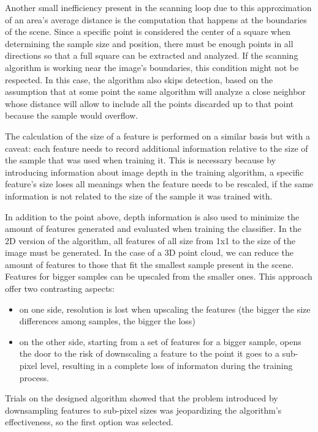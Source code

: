 \documentclass[a4paper,11pt,titlepage]{article}
\begin{document}
Another small inefficiency present in the scanning loop due to this
approximation of an area's average distance is the computation that happens at
the boundaries of the scene. Since a specific point is considered the center of
a square when determining the sample size and position, there must be enough
points in all directions so that a full square can be extracted and analyzed. If
the scanning algorithm is working near the image's boundaries, this condition
might not be respected. In this case, the algorithm also skips detection, based
on the assumption that at some point the same algorithm will analyze a close
neighbor whose distance will allow to include all the points discarded up to
that point because the sample would overflow.

The calculation of the size of a feature is performed on a similar basis but
with a caveat: each feature needs to record additional information relative to
the size of the sample that was used when training it. This is necessary because
by introducing information about image depth in the training algorithm, a
specific feature's size loses all meanings when the feature needs to be
rescaled, if the same information is not related to the size of the sample it
was trained with.

In addition to the point above, depth information is also used to minimize the
amount of features generated and evaluated when training the classifier. In the
2D version of the algorithm, all features of all size from 1x1 to the size of
the image must be generated. In the case of a 3D point cloud, we can reduce the
amount of features to those that fit the smallest sample present in the scene.
Features for bigger samples can be upscaled from the smaller ones. This approach
offer two contrasting aspects:

\begin{itemize}
  \item on one side, resolution is lost when upscaling the features (the bigger the
  size differences among samples, the bigger the loss)
  \item on the other side, starting from a set of features for a bigger sample, opens
  the door to the risk of downscaling a feature to the point it goes to a
  sub-pixel level, resulting in a complete loss of informaton during the training
  process.
\end{itemize}

Trials on the designed algorithm showed that the problem introduced by
downsampling features to sub-pixel sizes was jeopardizing the algorithm's
effectiveness, so the first option was selected.
\end{document}
